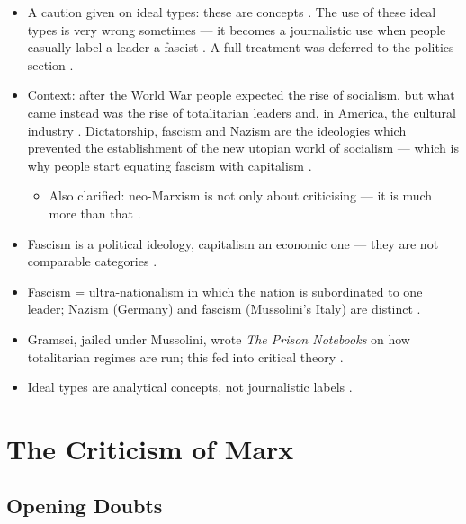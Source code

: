 \begin{CriticalPoint}
\begin{itemize}
    \item A caution given on ideal types: these are concepts . The use of these ideal types is very wrong sometimes --- it becomes a journalistic use when people casually label a leader a fascist . A full treatment was deferred to the politics section .
    \item Context: after the World War people expected the rise of socialism, but what came instead was the rise of totalitarian leaders and, in America, the cultural industry . Dictatorship, fascism and Nazism are the ideologies which prevented the establishment of the new utopian world of socialism --- which is why people start equating fascism with capitalism .
    \begin{itemize}
        \item Also clarified: neo-Marxism is not only about criticising --- it is much more than that .
    \end{itemize}
\end{itemize}
\end{CriticalPoint}

\begin{QuickRevision}
\begin{itemize}
    \item Fascism is a political ideology, capitalism an economic one --- they are not comparable categories .
    \item Fascism = ultra-nationalism in which the nation is subordinated to one leader; Nazism (Germany) and fascism (Mussolini's Italy) are distinct .
    \item Gramsci, jailed under Mussolini, wrote \emph{The Prison Notebooks} on how totalitarian regimes are run; this fed into critical theory .
    \item Ideal types are analytical concepts, not journalistic labels .
\end{itemize}
\end{QuickRevision}

\sectiondivider

\section{The Criticism of Marx}

\subsection{Opening Doubts}

